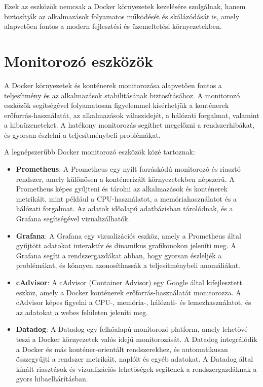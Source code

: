 Ezek az eszközök nemcsak a Docker környezetek kezelésére szolgálnak, hanem biztosítják az alkalmazások folyamatos működését és skálázódását is, amely alapvetően fontos a modern fejlesztési és üzemeltetési környezetekben.

\section{Monitorozó eszközök}

A Docker környezetek és konténerek monitorozása alapvetően fontos a teljesítmény és az alkalmazások stabilitásának biztosításához. A monitorozó eszközök segítségével folyamatosan figyelemmel kísérhetjük a konténerek erőforrás-használatát, az alkalmazások válaszidejét, a hálózati forgalmat, valamint a hibaüzeneteket. A hatékony monitorozás segíthet megelőzni a rendszerhibákat, és gyorsan észlelni a teljesítménybeli problémákat.

A legnépszerűbb Docker monitorozó eszközök közé tartoznak:

\begin{itemize}
	\item \textbf{Prometheus}: A Prometheus egy nyílt forráskódú monitorozó és riasztó rendszer, amely különösen a konténerizált környezetekben népszerű. A Prometheus képes gyűjteni és tárolni az alkalmazások és konténerek metrikáit, mint például a CPU-használatot, a memóriahasználatot és a hálózati forgalmat. Az adatok időalapú adatbázisban tárolódnak, és a Grafana segítségével vizualizálhatók.
	\item \textbf{Grafana}: A Grafana egy vizualizációs eszköz, amely a Prometheus által gyűjtött adatokat interaktív és dinamikus grafikonokon jeleníti meg. A Grafana segíti a rendszergazdákat abban, hogy gyorsan észleljék a problémákat, és könnyen azonosíthassák a teljesítménybeli anomáliákat.
	\item \textbf{cAdvisor}: A cAdvisor (Container Advisor) egy Google által kifejlesztett eszköz, amely a Docker konténerek erőforrás-használatát monitorozza. A cAdvisor képes figyelni a CPU-, memória-, hálózati- és lemezhasználatot, és az adatokat a webes felületen jeleníti meg.
	\item \textbf{Datadog}: A Datadog egy felhőalapú monitorozó platform, amely lehetővé teszi a Docker környezetek valós idejű monitorozását. A Datadog integrálódik a Docker és más konténer-orientált rendszerekhez, és automatikusan összegyűjti a rendszer metrikáit, naplóit és egyéb adatokat. A Datadog által kínált riasztások és vizualizációs lehetőségek segítenek a rendszergazdáknak a gyors hibaelhárításban.
\end{itemize}

